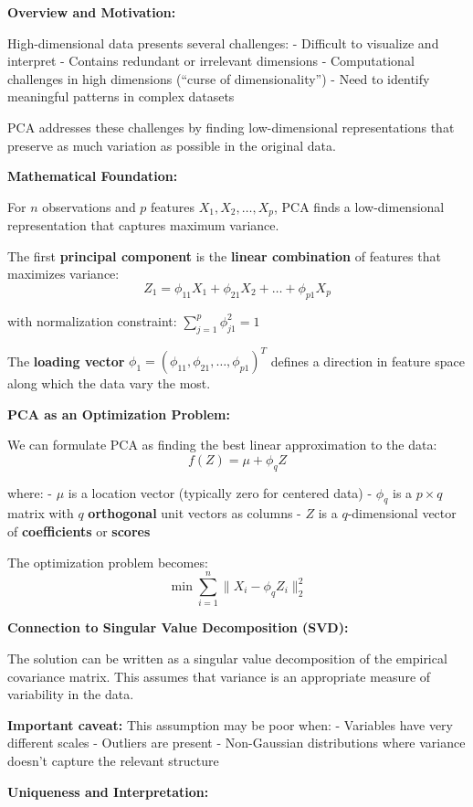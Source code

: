 \documentclass[
  letterpaper,
  DIV=11,
  numbers=noendperiod]{scrreprt}
\begin{document}
\textbf{Overview and Motivation:}

High-dimensional data presents several challenges: - Difficult to
visualize and interpret - Contains redundant or irrelevant dimensions -
Computational challenges in high dimensions (``curse of
dimensionality'') - Need to identify meaningful patterns in complex
datasets

PCA addresses these challenges by finding low-dimensional
representations that preserve as much variation as possible in the
original data.

\textbf{Mathematical Foundation:}

For \(n\) observations and \(p\) features \(X_1, X_2, \ldots, X_p\), PCA
finds a low-dimensional representation that captures maximum variance.

The first \textbf{principal component} is the \textbf{linear
combination} of features that maximizes variance:
\[Z_1  = \phi_{11}X_1 + \phi_{21}X_2 + \ldots + \phi_{p1}X_p\]

with normalization constraint: \(\sum_{j=1}^p \phi_{j1}^2 = 1\)

The \textbf{loading vector}
\(\phi_1 = (\phi_{11}, \phi_{21}, \ldots, \phi_{p1})^T\) defines a
direction in feature space along which the data vary the most.

\textbf{PCA as an Optimization Problem:}

We can formulate PCA as finding the best linear approximation to the
data: \[f(Z) = \mu + \phi_q Z\]

where: - \(\mu\) is a location vector (typically zero for centered data)
- \(\phi_q\) is a \(p \times q\) matrix with \(q\) \textbf{orthogonal}
unit vectors as columns - \(Z\) is a \(q\)-dimensional vector of
\textbf{coefficients} or \textbf{scores}

The optimization problem becomes:
\[\min \sum_{i=1}^n \| X_i - \phi_q Z_i \|_2^2\]

\textbf{Connection to Singular Value Decomposition (SVD):}

The solution can be written as a singular value decomposition of the
empirical covariance matrix. This assumes that variance is an
appropriate measure of variability in the data.

\textbf{Important caveat:} This assumption may be poor when: - Variables
have very different scales - Outliers are present - Non-Gaussian
distributions where variance doesn't capture the relevant structure

\textbf{Uniqueness and Interpretation:}
\end{document}
